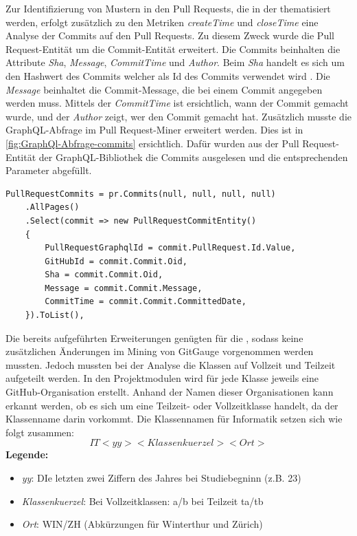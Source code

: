 Zur Identifizierung von Mustern in den Pull Requests, die in der  thematisiert werden, erfolgt zusätzlich zu den Metriken \textit{createTime} und \textit{closeTime} eine Analyse der Commits auf den Pull Requests. Zu diesem Zweck wurde die Pull Request-Entität um die Commit-Entität erweitert. Die Commits beinhalten die Attribute \textit{Sha}, \textit{Message}, \textit{CommitTime} und \textit{Author}. Beim \textit{Sha} handelt es sich um den Hashwert des Commits welcher als Id des Commits verwendet wird \parencite{noauthor_git_nodate}. Die \textit{Message} beinhaltet die Commit-Message, die bei einem Commit angegeben werden muss. Mittels der \textit{CommitTime} ist ersichtlich, wann der Commit gemacht wurde, und der \textit{Author} zeigt, wer den Commit gemacht hat. Zusätzlich musste die GraphQL-Abfrage im Pull Request-Miner erweitert werden. Dies ist in \autoref{fig:GraphQl-Abfrage-commits} ersichtlich. Dafür wurden aus der Pull Request-Entität der GraphQL-Bibliothek die Commits ausgelesen und die entsprechenden Parameter abgefüllt.
\begin{lstlisting}[language=CSharp, caption={GraphQL-Abfrage Pull Request Commits}, label={lst:graphql-commits}]
PullRequestCommits = pr.Commits(null, null, null, null)
    .AllPages()
    .Select(commit => new PullRequestCommitEntity()
    {
        PullRequestGraphqlId = commit.PullRequest.Id.Value,
        GitHubId = commit.Commit.Oid,
        Sha = commit.Commit.Oid,
        Message = commit.Commit.Message,
        CommitTime = commit.Commit.CommittedDate,
    }).ToList(),
\end{lstlisting}

\newpage
Die bereits aufgeführten Erweiterungen genügten für die , sodass keine zusätzlichen Änderungen im Mining von GitGauge vorgenommen werden mussten. Jedoch mussten bei der Analyse die Klassen auf Vollzeit und Teilzeit aufgeteilt werden. In den Projektmodulen wird für jede Klasse jeweils eine GitHub-Organisation erstellt. Anhand der Namen dieser Organisationen kann erkannt werden, ob es sich um eine Teilzeit- oder Vollzeitklasse handelt, da der Klassenname darin vorkommt. Die Klassennamen für Informatik setzen sich wie folgt zusammen: 
\begin{equation}
IT<yy><Klassenkuerzel><Ort>
\end{equation}
\noindent\textbf{Legende:}
\begin{itemize}
  \item \textit{yy}:  DIe letzten zwei Ziffern des Jahres bei Studiebegninn (z.B. 23)
  \item\textit{Klassenkuerzel}: Bei Vollzeitklassen: a/b bei Teilzeit ta/tb
  \item\textit{Ort}: WIN/ZH (Abkürzungen für Winterthur und Zürich)
\end{itemize}

